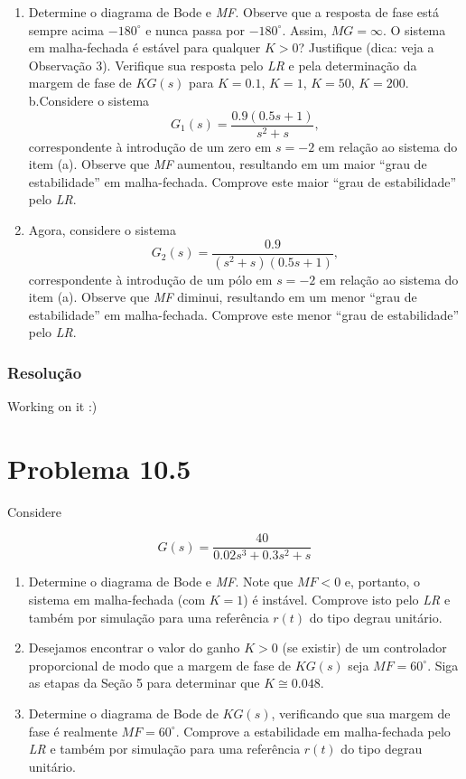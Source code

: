 \documentclass[
]{book}
\providecommand{\tightlist}{%
  \setlength{\itemsep}{0pt}\setlength{\parskip}{0pt}}
\theoremstyle{definition}
\theoremstyle{definition}
\theoremstyle{definition}
\theoremstyle{remark}
\begin{document}
\begin{enumerate}
\def\labelenumi{\alph{enumi}.}
\tightlist
\item
  Determine o diagrama de Bode e \emph{MF}. Observe que a resposta de fase está sempre acima \(−180^\circ\) e nunca passa por \(−180^\circ\). Assim, \(MG = \infty\). O sistema em malha-fechada é estável para qualquer \(K > 0\)? Justifique (dica: veja a Observação 3). Verifique sua resposta pelo \emph{LR} e pela determinação da margem de fase de \(KG(s)\) para \(K = 0.1\), \(K = 1\), \(K = 50\), \(K = 200\).
  b.Considere o sistema
  \[
  G_1(s) = \frac{0.9(0.5s + 1)}{s^2 + s},
  \]
  correspondente à introdução de um zero em \(s=-2\) em relação ao sistema do item (a). Observe que \emph{MF} aumentou, resultando em um maior ``grau de estabilidade'' em malha-fechada. Comprove este maior ``grau de estabilidade'' pelo \emph{LR}.
\item
  Agora, considere o sistema
  \[
  G_2(s) = \frac{0.9}{(s^2 + s)(0.5s + 1)},
  \]
  correspondente à introdução de um pólo em \(s = −2\) em relação ao sistema do item (a). Observe que \emph{MF} diminui, resultando em um menor ``grau de estabilidade'' em malha-fechada. Comprove este menor ``grau de estabilidade'' pelo \emph{LR}.
\end{enumerate}

\hypertarget{resoluuxe7uxe3o-37}{%
\subsubsection*{Resolução}\label{resoluuxe7uxe3o-37}}

Working on it :)

\hypertarget{problema-10.5}{%
\section*{Problema 10.5}\label{problema-10.5}}

Considere

\[
G(s) = \frac{40}{0.02s^3+0.3s^2+s}
\]

\begin{enumerate}
\def\labelenumi{\alph{enumi}.}
\tightlist
\item
  Determine o diagrama de Bode e \emph{MF}. Note que \(MF < 0\) e, portanto, o sistema em malha-fechada (com \(K = 1\)) é instável. Comprove isto pelo \emph{LR} e também por simulação para uma referência \(r(t)\) do tipo degrau unitário.
\item
  Desejamos encontrar o valor do ganho \(K > 0\) (se existir) de um controlador proporcional de modo que a margem de fase de \(KG(s)\) seja \(MF = 60^\circ\). Siga as etapas da Seção 5 para determinar que \(K \cong 0.048\).
\item
  Determine o diagrama de Bode de \(KG(s)\), verificando que sua margem de fase é realmente \(MF = 60^\circ\). Comprove a estabilidade em malha-fechada pelo \emph{LR} e também por simulação para uma referência \(r(t)\) do tipo degrau unitário.
\end{enumerate}
\end{document}
